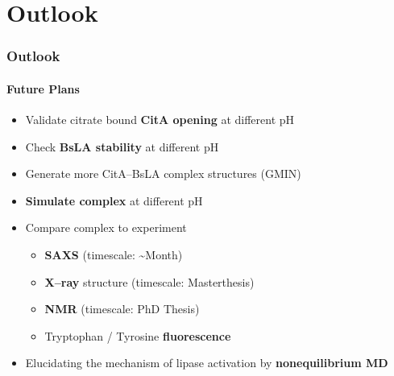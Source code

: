 \documentclass[english]{beamer}
\begin{document}
\begin{frame}
\begin{columns}[t]
    \end{columns} 


\end{frame}    



\section{Outlook}

\begin{frame}
    \frametitle{Outlook}
    \framesubtitle{Future Plans}

    \begin{itemize}
        \item Validate citrate bound \textbf{CitA opening} at different pH
        \item Check \textbf{BsLA stability} at different pH
        \item Generate more CitA--BsLA complex structures (GMIN)
        \item \textbf{Simulate complex} at different pH

        \pause

        \item Compare complex to experiment
            \begin{itemize}
                \item \textbf{SAXS} (timescale: \textasciitilde Month)
                \item \textbf{X--ray} structure (timescale: Masterthesis)
                \item \textbf{NMR} (timescale: PhD Thesis)
                \item Tryptophan / Tyrosine \textbf{fluorescence}
            \end{itemize}

        \pause

    \item Elucidating the mechanism of lipase activation by \textbf{nonequilibrium MD}
    \end{itemize}
\end{frame}   
 
\end{document}
